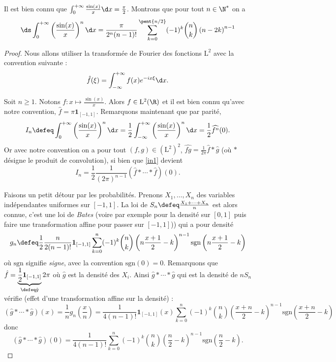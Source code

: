 \documentclass{notes}
\begin{document}

Il est bien connu que $\int_{0}^{+\infty} \frac{\sin(x)}{x} \d x = \frac{\pi}{2}$. Montrons que pour tout $n\in\N^{*}$ on a 
\[ \ds\int_0^{+\infty} \left( \frac{\sin(x)}{x} \right)^{n}\d x = \frac{\pi}{2^{n}(n-1)!}  \sum_{k=0}^{\pent{n/2}} (-1)^{k}\binom nk \left( n - 2k \right)^{n-1}\] 

\begin{proof}
  Nous allons utiliser la transformée de Fourier des fonctions $\mathrm L^{2}$ avec la convention suivante : 
  \[ \hat f(\xi) = \int_{-\infty}^{+\infty} f(x) e^{-ix \xi} \d x. \]

  Soit $n\geq 1$. Notons $f\colon x \mapsto \frac{\sin(x)}{x}$. Alors $f\in\mathrm L^{2}(\R)$ et il est bien connu qu'avec notre convention, $\hat f = \pi \mathbf 1_{[-1,1]}$. Remarquons maintenant que par parité, 
  \begin{equation}
    \label{in1}
    I_n \defeq \int_{0}^{+\infty} \left( \frac{\sin(x)}{x} \right)^{n} \d x = \frac 12 \int_{-\infty}^{+\infty} \left( \frac{\sin(x)}{x} \right)^{n} \d x = \frac 12 \widehat{f^{n}}(0). 
  \end{equation}
  Or avec notre convention on a pour tout $(f,g)\in (\mathrm L^{2})^{2}$, $\widehat{fg}= \frac 1{2\pi} \hat f \ast \hat g$ (où $\ast$ désigne le produit de convolution), si bien que \eqref{in1} devient  
  \begin{equation}
    \label{in2}
    I_n = \frac 12 \frac{1}{(2\pi)^{n-1}} \left( \hat f\ast \cdots \ast \hat  f \right)(0).
  \end{equation}

  Faisons un petit détour par les probabilités. Prenons $X_1,\dots,X_n$ des variables indépendantes uniformes sur $[-1,1]$. La loi de $S_n \defeq \frac{X_1+\cdots+X_n}{n}$ est alors connue, c'est une loi de \emph{Bates} (voire par exemple \cite{JKB} pour la densité sur $[0,1]$ puis faire une transformation affine pour passer sur $[-1,1]$)) qui a pour densité 
  \[ g_{n} \defeq  \frac 12 \frac{n}{2(n-1)!}  \mathbf 1_{[-1,1]} \sum_{k=0}^{n} (-1)^{k} \binom nk \left( n\frac{x+1}{2}- k \right)^{n-1} \mathrm{sgn}\left( n\frac{x+1}{2}- k \right) \]
  où $\mathrm{sgn}$ signifie \emph{signe}, avec la convention $\text{sgn}(0)=0$. Remarquons que $\hat f = \underbrace{\frac 12 \mathbf 1_{[-1,1]}}_{\defeq \hat g} 2\pi$ où $\hat g$ est la densité des $X_i$. Ainsi $\hat g \ast \cdots \ast \hat g$ qui est la densité de $nS_n$ vérifie (effet d'une transformation affine sur la densité) : 
  \[ \left( \hat g \ast \cdots \ast \hat g \right)(x) = \frac 1n g_{n}\left( \frac xn \right) =  \frac 1{4(n-1)!} \mathbf 1_{[-1,1]}(x) \sum_{k=0}^{n} (-1)^{k} \binom nk \left( \frac{x+n}{2}-k \right)^{n-1} \mathrm{sgn} \left( \frac{x+n}{2}-k  \right) \] 
  donc \[ \left( \hat g\ast \cdots \ast \hat g \right)(0) = \frac 1{4(n-1)!} \sum_{k=0}^{n} (-1)^{k}\binom nk \left( \frac n2 - k \right)^{n-1}\mathrm{sgn} \left( \frac n2 - k \right). \]


\end{proof}
\end{document}
